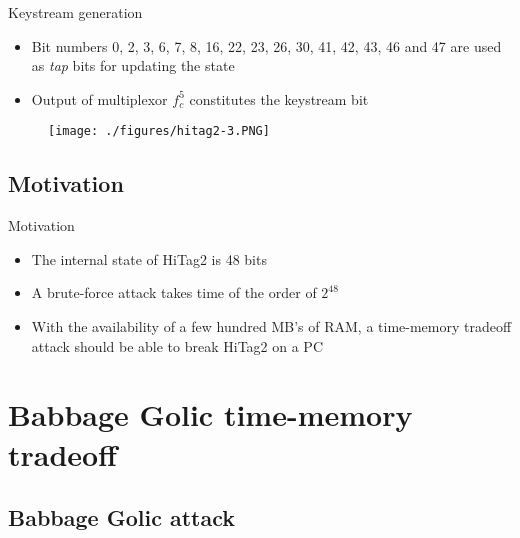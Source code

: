 \documentclass{beamer}
\begin{document}
\begin{frame}{Keystream generation}
\begin{itemize} 
	\item Bit numbers 0, 2, 3, 6, 7, 8, 16, 22, 23, 26, 30, 41, 42, 43, 46 and 47 are used as \textit{tap} bits for updating the state
	\item Output of multiplexor $f_c^5$ constitutes the keystream bit
\end{itemize}

	\begin{figure}[htp]
	\centering
	\texttt{[image: ./figures/hitag2-3.PNG]}
	\end{figure}

\end{frame}

\subsection{Motivation}
\begin{frame}{Motivation}
\begin{itemize}
	\item The internal state of HiTag2 is 48 bits
	\item A brute-force attack takes time of the order of $2^{48}$
	\item With the availability of a few hundred MB's of RAM, a time-memory tradeoff attack should be able to break HiTag2 on a PC
\end{itemize}
\end{frame}

\section{Babbage Golic time-memory tradeoff}

\subsection{Babbage Golic attack}
\end{document}
